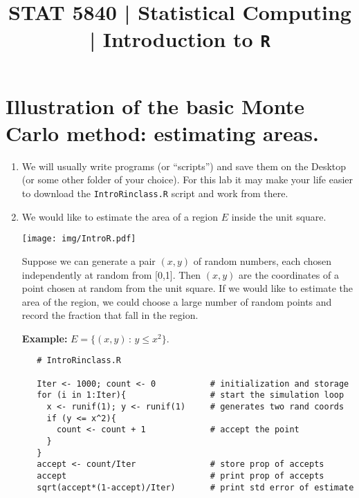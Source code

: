 \documentclass[10pt,english]{article}
\title{STAT 5840 | Statistical Computing | Introduction to \texttt{R}}
\date{}
\begin{document}
\maketitle

\thispagestyle{empty}

\section*{Illustration of the basic Monte Carlo method: \textbf{estimating areas}.}
\label{sec-1}



\begin{enumerate}
\item We will usually write programs (or ``scripts'') and save them on the Desktop (or some other folder of your choice).  For this lab it may make your life easier to download the \texttt{IntroRinclass.R} script and work from there.
\item We would like to estimate the area of a region $E$ inside the unit square.

   \begin{center}

   \texttt{[image: img/IntroR.pdf]}

   \end{center}

   Suppose we can generate a pair \( (x,y) \) of random numbers, each chosen independently at random from [0,1].  Then \( (x,y) \) are the coordinates of a point chosen at random from the unit square.  If we would like to estimate the area of the region, we could choose a large number of random points and record the fraction that fall in the region.

   \textbf{Example:} $E = \{ (x,y)\, : \, y \leq x^2  \}$.

\begin{verbatim}
   # IntroRinclass.R

   Iter <- 1000; count <- 0           # initialization and storage
   for (i in 1:Iter){                 # start the simulation loop       
     x <- runif(1); y <- runif(1)     # generates two rand coords
     if (y <= x^2){ 
       count <- count + 1             # accept the point
     }
   }
   accept <- count/Iter               # store prop of accepts
   accept                             # print prop of accepts
   sqrt(accept*(1-accept)/Iter)       # print std error of estimate
\end{verbatim}


\end{enumerate}
\end{document}
